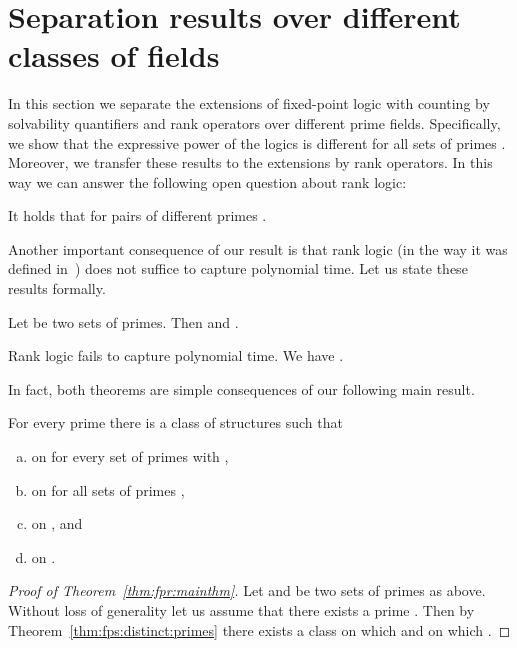 \documentclass[a4paper,UKenglish]{lipics}
\theoremstyle{plain}
\begin{document}
\section{Separation results over different classes of fields}
\label{sec:sep:fields}

In this section we separate the extensions of fixed-point logic with counting 
by solvability quantifiers and rank operators over different prime fields. 
Specifically, we show that the expressive power of the logics  
is different for all sets of primes .
Moreover, we transfer these results to the extensions  by rank 
operators. In this way we can answer the following open question about rank 
logic:
\begin{center}
 It holds that  for pairs of different primes . 
\cite{DaHo12, Ho10, La11}
\end{center}

Another important consequence of our result is that rank logic (in the way it 
was defined in~\cite{DaGrHoLa09}) does not suffice to capture 
polynomial time. 
Let us state these results formally.

\begin{theorem}\label{thm:fpr:mainthm}
 Let  be two sets of primes.
Then  and .
\end{theorem}

\begin{theorem} \label{thm:ranklogic:ptime}
Rank logic fails to capture polynomial time. We have .
\end{theorem}

\noindent
In fact, both theorems are simple consequences of our following main result.
\begin{theorem}\label{thm:fps:distinct:primes}
For every prime  there is a class of structures  such that
\begin{enumerate}[(a)]
  \item  on  for every set of primes  
with , 
\label{thm:fps:distinct:primes:fps:fpc}
 \item  on  for all sets of primes 
, 
 \label{thm:fps:distinct:primes:fpr:fps}
 \item  on , and
 \label{thm:fps:distinct:primes:fpc:not:ptime}
  \item  on .
 \label{thm:fps:fpsq:ptime}
\end{enumerate} 
\end{theorem}

\begin{proof}[Proof of Theorem~\ref{thm:fpr:mainthm}]
 Let  and  be two sets of primes as above. Without loss of 
generality let us assume that there exists a prime . Then by Theorem~\ref{thm:fps:distinct:primes} there exists a class 
 on which  and on which
.
\end{proof}
\end{document}

